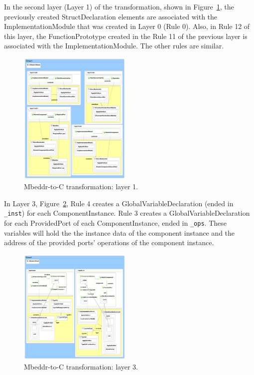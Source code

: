 In the second layer (Layer 1) of the transformation, shown in Figure~\ref{fig:mb2c_layer_1}, the previously created StructDeclaration elements are associated with the ImplementationModule that was created in Layer 0 (Rule 0).
Also, in Rule 12 of this layer, the FunctionPrototype created in the Rule 11 of the previous layer is associated with the ImplementationModule.
The other rules are similar.

\begin{figure}
\begin{center}
  \includegraphics[width=0.48\textwidth]{figures/mbeddr2C_optimized_layer_1}
  \caption{Mbeddr-to-C transformation: layer 1.}
  \label{fig:mb2c_layer_1}
\end{center}
\end{figure}

In Layer 3, Figure~\ref{fig:mb2c_layer_3}, Rule 4 creates a GlobalVariableDeclaration (ended in \verb=_inst=) for each ComponentInstance.
Rule 3 creates a GlobalVariableDeclaration for each ProvidedPort of each ComponentInstance, ended in \verb=_ops=.
These variables will hold the the instance data of the component instance and the address of the provided ports' operations of the component instance.

\begin{figure}
\begin{center}
  \includegraphics[width=0.48\textwidth]{figures/mbeddr2C_optimized_layer_3}
  \caption{Mbeddr-to-C transformation: layer 3.}
  \label{fig:mb2c_layer_3}
\end{center}
\end{figure}

